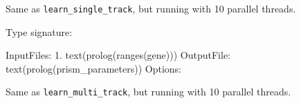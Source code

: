 \begin{description}
Same as \verb$learn_single_track$, but running with 10 parallel threads.

Type signature:

\begin{code}
InputFiles:
    1. text(prolog(ranges(gene)))
OutputFile:
    text(prolog(prism_parameters))
Options:
\end{code}

Same as \verb$learn_multi_track$, but running with 10 parallel threads.
\end{description}

